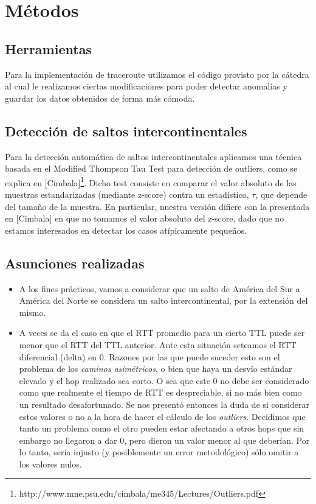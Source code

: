 \section{Métodos}

\subsection*{Herramientas}
Para la implementación de traceroute utilizamos el código provisto por la cátedra al cual le realizamos ciertas modificaciones para poder detectar anomalías y guardar los datos obtenidos de forma más cómoda.

\subsection*{Detección de saltos intercontinentales}

Para la detección automática de saltos intercontinentales aplicamos una técnica basada en el Modified Thompson Tau Test para detección de outliers, como se explica en [Cimbala]\footnote{http://www.mne.psu.edu/cimbala/me345/Lectures/Outliers.pdf}. Dicho test consiste en comparar el valor absoluto de las muestras estandarizadas (mediante z-score) contra un estadístico, $\tau$, que depende del tamaño de la muestra. En particular, nuestra versión difiere con la presentada en [Cimbala] en que no tomamos el valor absoluto del z-score, dado que no estamos interesados en detectar los casos atípicamente pequeños. 

\subsection*{Asunciones realizadas}
\begin{itemize}
	\item A los fines prácticos, vamos a considerar que un salto de América del Sur a América del Norte se considera un salto intercontinental, por la extensión del mismo.
	\item A veces se da el caso en que el RTT promedio para un cierto TTL puede ser menor que el RTT del TTL anterior. Ante esta situación seteamos el RTT diferencial (delta) en 0. Razones por las que puede suceder esto son el problema de los \emph{caminos asimétricos}, o bien que haya un desvío estándar elevado y el hop realizado sea corto. O sea que este 0 no debe ser considerado como que realmente el tiempo de RTT es despreciable, si no más bien como un resultado desafortunado. Se nos presentó entonces la duda de si considerar estos valores o no a la hora de hacer el cálculo de los \emph{outliers}. Decidimos que tanto un problema como el otro pueden estar afectando a otros hops que sin embargo no llegaron a dar 0, pero dieron un valor menor al que deberían. Por lo tanto, sería injusto (y posiblemente un error metodológico) sólo omitir a los valores nulos.
\end{itemize}


